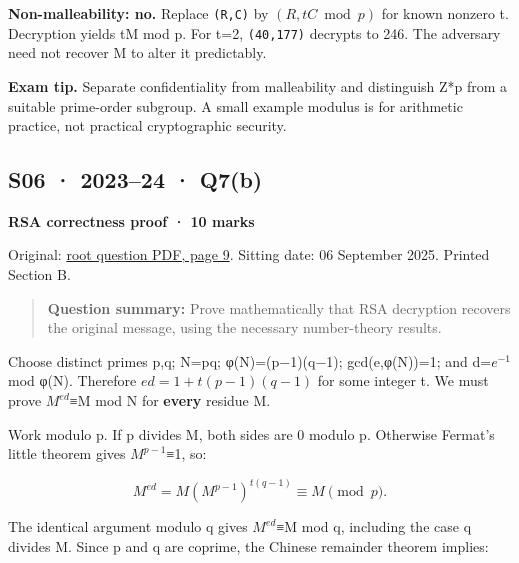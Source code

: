 \documentclass[11pt,a4paper]{article}
\begin{document}
\textbf{Non-malleability: no.} Replace \texttt{(R,\allowbreak{}C)} by \((R,tC\bmod p)\) for known nonzero t. Decryption yields tM mod p. For t=\allowbreak{}2,\allowbreak{} \texttt{(40,\allowbreak{}177)} decrypts to 246. The adversary need not recover M to alter it predictably.



{\color{ForestGreen}\textbf{Exam tip.} Separate confidentiality from malleability and distinguish Z*p from a suitable prime-order subgroup. A small example modulus is for arithmetic practice,\allowbreak{} not practical cryptographic security.}




\clearpage
\subsection{S06 · 2023–24 · Q7(b)}\label{s06}

\textbf{RSA correctness proof · 10 marks}


Original: \href{../../CSE405-Security_Merged.pdf\#page=9}{root question PDF,\allowbreak{} page 9}. Sitting date: 06 September 2025. Printed Section B.



\begin{quote}\small

\textbf{Question summary:} Prove mathematically that RSA decryption recovers the original message,\allowbreak{} using the necessary number-theory results.



\end{quote}

Choose distinct primes p,\allowbreak{}q; N=\allowbreak{}pq; φ(N)=\allowbreak{}(p−1)(q−1); gcd(e,\allowbreak{}φ(N))=\allowbreak{}1; and d=\allowbreak{}\(e^{-1}\) mod φ(N). Therefore \(ed=1+t(p-1)(q-1)\) for some integer t. We must prove \(M^{ed}\)≡M mod N for \textbf{every} residue M.


Work modulo p. If p divides M,\allowbreak{} both sides are 0 modulo p. Otherwise Fermat’s little theorem gives \(M^{p-1}\)≡1,\allowbreak{} so:



\[
M^{ed}=M\left(M^{p-1}\right)^{t(q-1)}\equiv M\pmod p.
\]

The identical argument modulo q gives \(M^{ed}\)≡M mod q,\allowbreak{} including the case q divides M. Since p and q are coprime,\allowbreak{} the Chinese remainder theorem implies:
\end{document}
